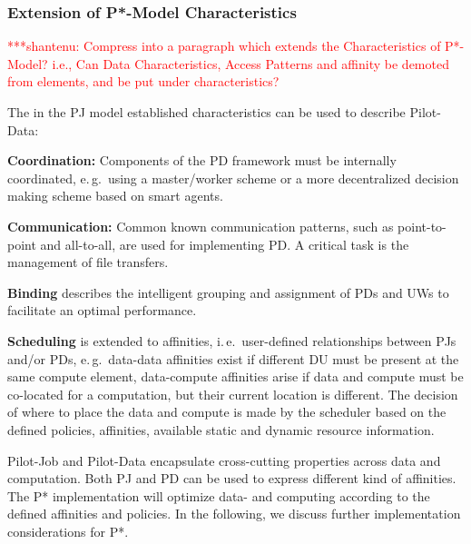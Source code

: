 \documentclass[conference,final]{IEEEtran}
\newcommand{\jhanote}[1]{ {\textcolor{red} { ***shantenu: #1 }}}
\newcommand{\alnote}[1]{ {\textcolor{blue} { ***andre: #1 }}}
\newcommand{\alnote}[1]{}
\newcommand{\jhanote}[1]{}
\begin{document}

\subsubsection*{Extension of P*-Model Characteristics}

\jhanote{Compress into a paragraph which extends the Characteristics
  of P*-Model? i.e., Can Data Characteristics, Access Patterns and
  affinity be demoted from elements, and be put under
  characteristics?}

The in the PJ model established characteristics can be used
to describe Pilot-Data: 
\begin{compactitem}
   \item \textbf{Coordination:} Components of the PD framework must be 
   internally coordinated, e.\,g.\ using a master/worker scheme or a more 
   decentralized decision making scheme based on smart agents.
   \item \textbf{Communication:} Common known communication patterns, such as 
    point-to-point and all-to-all, are used for implementing PD. A   
	 critical task is the management of file transfers.
   \item \textbf{Binding} describes the intelligent grouping and assignment of 
   PDs and UWs to facilitate an optimal performance. 
   \item \textbf{Scheduling} is extended to affinities, i.\,e.\ user-defined 
   relationships between PJs and/or PDs, e.\,g.\ data-data  
   affinities exist if different DU must be present at the same compute element, 
   data-compute affinities arise if data and compute must be co-located for a 
   computation, but their current location is different. The decision of where 
   to place the data and compute is made by the scheduler based on the defined 
   policies, affinities, available static and dynamic resource information. 
\end{compactitem}  

Pilot-Job and Pilot-Data encapsulate cross-cutting properties across data and
computation. Both PJ and PD can be used to express different kind of affinities.
The P* implementation will optimize data- and computing according to the defined
affinities and policies. In the following, we discuss further implementation
considerations for P*.
\end{document}
